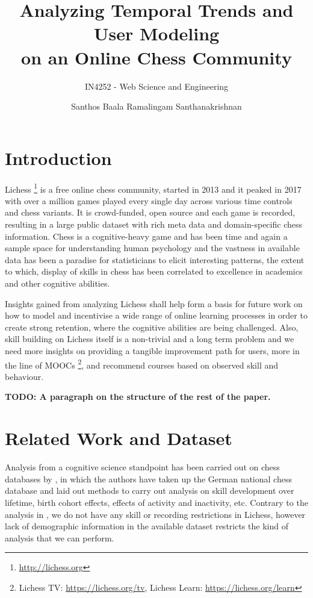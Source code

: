 \documentclass[sigconf]{acmart}
\title{Analyzing Temporal Trends and User Modeling\\ on an Online Chess Community}
\subtitle{IN4252 - Web Science and Engineering}
\author{Santhos Baala Ramalingam Santhanakrishnan}
\affiliation{TU Delft - Student Number 4740270}
\begin{document}

\maketitle

\section{Introduction}

Lichess \footnote{\url{http://lichess.org}} is a free online chess community, started in 2013 and it peaked in 2017 with over a million games played every single day across various time controls and chess variants. It is crowd-funded, open source and each game is recorded, resulting in a large public dataset with rich meta data and domain-specific chess information. Chess is a cognitive-heavy game and has been time and again a sample space for understanding human psychology and the vastness in available data has been a paradise for statisticians to elicit interesting patterns, the extent to which, display of skills in chess has been correlated to excellence in academics and other cognitive abilities.

Insights gained from analyzing Lichess shall help form a basis for future work on how to model and incentivise a wide range of  online learning processes in order to create strong retention, where the cognitive abilities are being challenged. Also, skill building on Lichess itself is a non-trivial and a long term problem and we need more insights on providing a tangible improvement path for users, more in the line of MOOCs \footnote{Lichess TV: \url{https://lichess.org/tv}, Lichess Learn: \url{https://lichess.org/learn}}, and recommend courses based on observed skill and behaviour.

\textbf{TODO: A paragraph on the structure of the rest of the paper.}
\lipsum[1]

\section{Related Work and Dataset}

Analysis from a cognitive science standpoint has been carried out on chess databases by \cite{vaci2017chess}, in which the authors have taken up the German national chess database and laid out methods to carry out analysis on skill development over lifetime, birth cohort effects, effects of activity and inactivity, etc. Contrary
to the analysis in \cite{vaci2017chess}, we do not have any skill or recording restrictions in Lichess, however lack
of demographic information in the available dataset restricts the kind of analysis that we can perform. 
\end{document}
